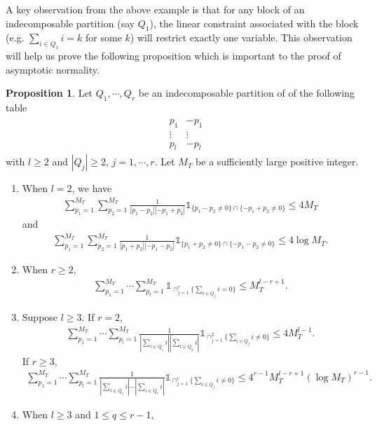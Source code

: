 \documentclass[11pt]{article}
\numberwithin{equation}{section}
\theoremstyle{plain}
\theoremstyle{definition}
\theoremstyle{definition}
\theoremstyle{assumption}
\theoremstyle{proposition}
\newtheorem{proposition}{Proposition}[section]
\theoremstyle{proposition}
\theoremstyle{example}
\theoremstyle{lemma}
\theoremstyle{theorem}
\theoremstyle{remark}
\begin{document}
A key observation from the above example is that for any block of an indecomposable partition (say $Q_1$), the linear constraint associated with the block (e.g. $\sum_{i\in Q_1}i = k$ for some $k$) will restrict exactly one variable. This observation will help us prove the following proposition which is important to the proof of asymptotic normality.
\begin{proposition}\label{indecomp_sum_corollary}
Let $Q_1,\cdots,Q_r$ be an indecomposable partition of of the following table
\begin{align*}
\begin{matrix}
&p_1&-p_1 \\
&\vdots&\vdots \\
&p_l&-p_l
\end{matrix}
\end{align*}
with $l\geqslant 2$ and $|Q_j|\geqslant2$, $j=1,\cdots,r$. Let $M_T$ be a sufficiently large positive integer.
\begin{enumerate}
\item When $l=2$, we have
\begin{align*}
\sum_{p_1=1}^{M_T}\sum_{p_2=1}^{M_T}\frac{1}{|p_1 - p_2||-p_1 + p_2|}\mathds{1}_{\{p_1 - p_2 \neq 0\}\cap\{-p_1 + p_2 \neq 0\}}
\leqslant 4 M_T
\end{align*}
and
\begin{align*}
\sum_{p_1=1}^{M_T}\sum_{p_2=1}^{M_T}\frac{1}{|p_1 + p_2||-p_1 - p_2|}\mathds{1}_{\{p_1 + p_2 \neq 0\}\cap\{-p_1 - p_2 \neq 0\}}
\leqslant 4 \log M_T .
\end{align*}
\item When $r\geqslant2$,
\begin{align*}
\sum_{p_1=1}^{M_T}\cdots\sum_{p_l=1}^{M_T}\mathds{1}_{\cap_{j=1}^r\{\sum_{i\in Q_j} i = 0\}}
\leqslant M_T^{l-r+1} .
\end{align*}
\item Suppose $l\geqslant3$. If $r=2$,
\begin{align*}
\sum_{p_1=1}^{M_T}\cdots\sum_{p_l=1}^{M_T}\frac{1}{|\sum_{i\in Q_1} i||\sum_{i\in Q_2} i|}\mathds{1}_{\cap_{j=1}^2\{\sum_{i\in Q_j} i \neq 0\}}
\leqslant 4 M_T^{l-1} .
\end{align*}
If $r\geqslant3$,
\begin{align*}
\sum_{p_1=1}^{M_T}\cdots\sum_{p_l=1}^{M_T}\frac{1}{|\sum_{i\in Q_1} i|\cdots|\sum_{i\in Q_r} i|}\mathds{1}_{\cap_{j=1}^r\{\sum_{i\in Q_j} i \neq 0\}}
\leqslant 4^{r-1} M_T^{l-r+1}(\log M_T)^{r-1} .
\end{align*}
\item When $l\geqslant 3$ and $1\leqslant q\leqslant r-1$,

\end{enumerate}
\end{proposition}
\end{document}
